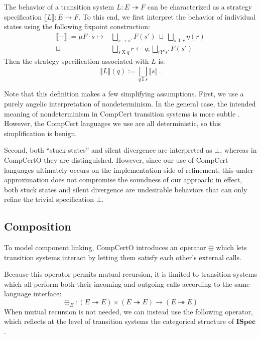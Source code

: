 \documentclass[sigplan,10pt,authordraft]{acmart}
\newcommand{\ISpec}{\mathbf{ISpec}}
\begin{document}
The behavior of a transition system
$L : E \twoheadrightarrow F$
can be characterized as a strategy specification
$\llbracket L \rrbracket : E \rightarrow F$.
To this end,
we first interpret the behavior of individual states
using the following fixpoint construction:
\begin{align*}
  \llbracket - \rrbracket :=
  \mu F \cdot s \mapsto
  &\bigsqcup_{s \rightarrow s'} F(s') \: \sqcup \:
   \bigsqcup_{s \mathrel{T} r} \eta(r) \\ \sqcup \:
  &\bigsqcup_{s \mathrel{X} q}
    r \mathbin\leftarrow \underline{q} \mathbin;
    \bigsqcup_{r \mathrel{Y^s} s'} F(s')
\end{align*}
Then the strategy specification associated with $L$ is:
\[
  \llbracket L \rrbracket(q) :=
    \bigsqcup_{q \mathrel{I} s} \llbracket s \rrbracket
    \,.
\]

Note that this definition makes a few simplifying assumptions.
First,
we use a purely angelic interpretation of nondeterminism.
In the general case,
the intended meaning of nondeterminism in CompCert transition systems
is more subtle \cite[\S8.1]{thesis}.
However,
the CompCert languages we use are all deterministic,
so this simplification is benign.

Second,
both ``stuck states'' and silent divergence
are interpreted as $\bot$,
whereas in CompCertO they are distinguished.
However,
since our use of CompCert languages
ultimately occurs on the implementation side of refinement,
this under-approximation does not compromise
the soundness of our approach:
in effect,
both stuck states and silent divergence
are undesirable behaviors that can 
only refine the trivial specification $\bot$.


\subsection{Composition} %

To model component linking,
CompCertO introduces an operator $\oplus$
which lets transition systems interact
by letting them satisfy each other's external calls.

Because this operator permits mutual recursion,
it is limited to transition systems which all perform
both their incoming and outgoing calls
according to the same language interface:
\[
  {\oplus_E} :
    (E \twoheadrightarrow E) \times
    (E \twoheadrightarrow E) \rightarrow
    (E \twoheadrightarrow E)
\]
When mutual recursion is not needed,
we can instead use the following operator,
which reflects at the level of transition systems
the categorical structure of $\ISpec$.
\end{document}

